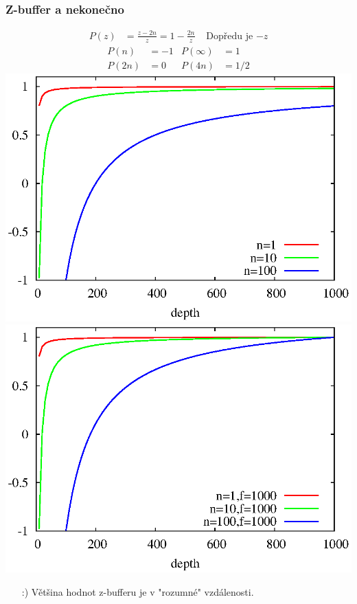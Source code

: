 \begin{frame}
    \frametitle{Z-buffer a nekonečno}
    \begin{align*}
        P(z) &= \frac{z - 2n}{z} = 1 - \frac{2n}{z} & \text{ Dopředu je $-z$}
    \end{align*}
    \pause\vfill
    \begin{align*}
        P(n) &= -1 & P(\infty) &=  1 \\
        P(2n) &= 0 & P(4n) &= 1/2
    \end{align*}
    \includegraphics[width=.5\textwidth]{pics/shadows/shadowVolumes/plot/infdepth.eps}
    \includegraphics[width=.5\textwidth]{pics/shadows/shadowVolumes/plot/findepth.eps}
    \begin{itemize}
        \item[:)] Většina hodnot z-bufferu je v "rozumné" vzdálenosti.
    \end{itemize}
\end{frame}

